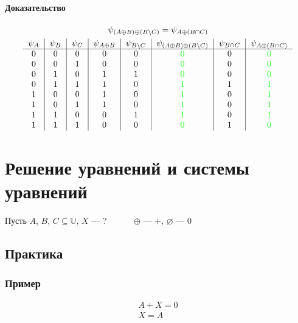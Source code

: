 \documentclass{article}
\begin{document}
\paragraph{Доказательство}
\begin{gather*}
    \psi_{(A \oplus B) \oplus (B \setminus C)} = \psi_{A \oplus (B \cap C)} \\
    \begin{tabular}{c|c|c|c|c|c|c|c}
        $\psi_A$ & $\psi_B$ & $\psi_C$ & $\psi_{A \oplus B}$ & $\psi_{B \setminus C}$ & $\psi_{(A \oplus B) \oplus (B \setminus C)}$ & $\psi_{B \cap C}$ & $\psi_{A \oplus (B \cap C)}$ \\
        \hline
        0 & 0 & 0 & 0 & 0 & \textcolor{green}{0} & 0 & \textcolor{green}{0} \\
        0 & 0 & 1 & 0 & 0 & \textcolor{green}{0} & 0 & \textcolor{green}{0} \\
        0 & 1 & 0 & 1 & 1 & \textcolor{green}{0} & 0 & \textcolor{green}{0} \\
        0 & 1 & 1 & 1 & 0 & \textcolor{green}{1} & 1 & \textcolor{green}{1} \\
        1 & 0 & 0 & 1 & 0 & \textcolor{green}{1} & 0 & \textcolor{green}{1} \\
        1 & 0 & 1 & 1 & 0 & \textcolor{green}{1} & 0 & \textcolor{green}{1} \\
        1 & 1 & 0 & 0 & 1 & \textcolor{green}{1} & 0 & \textcolor{green}{1} \\
        1 & 1 & 1 & 0 & 0 & \textcolor{green}{0} & 1 & \textcolor{green}{0} \\  
    \end{tabular}
\end{gather*}



\section{Решение уравнений и системы уравнений}
Пусть $A$, $B$, $C \subseteq \mathbb{U}$, $X$ --- ? ~~~~~ $\oplus$ --- $+$, $\varnothing$ --- $0$

\subsection{Практика}

\subsubsection{Пример}
\begin{gather*}
    A + X = 0 \\
    X = A
\end{gather*}
\end{document}

